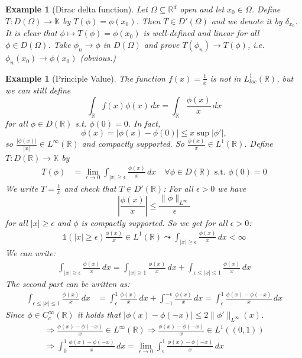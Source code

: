 \documentclass{report}
\theoremstyle{tommy}
\newtheorem{eg}[defn]{Example}
\begin{document}
  \begin{eg}[Dirac delta function]
    Let \(\Omega \subseteq \mathbb{R}^d\) open and let \(x_0 \in \Omega\). Define \(T: D(\Omega) \to \mathbb{K}\) by \(T(\phi) = \phi(x_0)\). Then \(T \in D'(\Omega)\) and we denote it by \(\delta_{x_0}\). It is clear that \(\phi \mapsto T(\phi) = \phi(x_0)\) is well-defined and linear for all \(\phi \in D(\Omega)\). Take \(\phi_n \to \phi\) in \(D(\Omega)\) and prove \(T(\phi_n) \to T(\phi)\), i.e. \(\phi_n(x_0) \to \phi(x_0)\) (obvious.)
  \end{eg}

  \begin{eg}[Principle Value]
    The function \(f(x) = \frac{1}{x}\) is not in \(L_{loc}^1(\mathbb{R})\), but we can still define
    \[\int_{\mathbb{R}} f(x) \phi(x) \, dx = \int_{\mathbb{R}} \frac{\phi(x)}{x} \, dx\] for all \(\phi \in D(\mathbb{R})\) s.t. \(\phi(0) = 0\). In fact, \[\phi(x) = |\phi(x)-\phi(0)| \le  x \sup |\phi'|,\] so \(\frac{|\phi(x)|}{|x|} \in L^\infty(\mathbb{R})\) and compactly supported. So \(\frac{\phi(x)}{x} \in L^1(\mathbb{R})\).
    Define \(T: D(\mathbb{R}) \to \mathbb{K}\) by \begin{align*}
      T(\phi) 
      &= \lim_{\epsilon \to 0} \int_{|x| \ge \epsilon} \frac{\phi(x)}{x} \, dx \quad \forall \phi \in D(\mathbb{R}) \text{ s.t. } \phi(0) = 0
    \end{align*}
    We write \(T = \frac{1}{x}\) and check that \(T \in D'(\mathbb{R})\): For all \(\epsilon > 0\) we have  \[\left|\frac{\phi(x)}{x}\right| \le \frac{\|\phi\|_{L^\infty}}{\epsilon}\] for all \(|x| \ge \epsilon\) and \(\phi\) is compactly supported. So we get for all \(\epsilon > 0\):
    \begin{align*}
      \mathbb{1}(|x| \ge \epsilon)\frac{\phi(x)}{x} \in L^1(\mathbb{R}) \leadsto \int_{|x| \ge \epsilon} \frac{\phi(x)}{x} \, dx < \infty
    \end{align*}
    We can write:
    \begin{align*}
      \int_{|x| \ge \epsilon} \frac{\phi(x)}{x} \, dx 
      = \int_{|x|\ge 1} \frac{\phi(x)}{x} \, dx + \int_{\epsilon \le |x|\le 1} \frac{\phi(x)}{x}\, dx
    \end{align*}
    The second part can be written as:
    \begin{align*}
      \int_{\epsilon \le |x| \le 1} \frac{\phi(x)}{x} \, dx
      &= \int_{\epsilon}^1 \frac{\phi(x)}{x} \, dx + \int_{-1}^{-\epsilon} \frac{\phi(x)}{x} \, dx 
      = \int_\epsilon^1 \frac{\phi(x) - \phi(-x)}{x}\, dx
    \end{align*}
    Since \(\phi \in C_c^\infty(\mathbb{R})\) it holds that \(|\phi(x) - \phi(-x)|  \le 2 \|\phi'\|_{L^\infty}(x)\).
    \begin{align*}
      \Rightarrow \frac{\phi(x) - \phi(-x)}{x} \in L^\infty(\mathbb{R})
      \Rightarrow \frac{\phi(x) - \phi(-x)}{x} \in L^1((0, 1)) \\
      \Rightarrow \int_0^1 \frac{\phi(x) - \phi(-x)}{x} \, dx = \lim_{\epsilon \to 0} \int_\epsilon^1 \frac{\phi(x) - \phi(-x)}{x} \, dx
    \end{align*}
  \end{eg}
\end{document}
